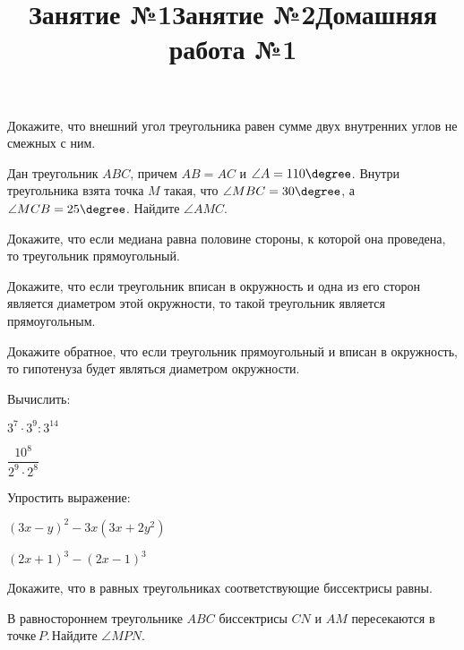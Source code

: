 \title{Занятие №1}
\begin{listofex}
	\item {}
	\item {}
	\item {}
	\item Докажите, что внешний угол треугольника равен сумме двух внутренних углов не смежных с ним.
	\item {}
	\item {}
	\item {}
	\item {}
	\item {}
	\item {}
\end{listofex}
\newpage
\title{Занятие №2}
\begin{listofex}
	\item Дан треугольник \( ABC \), причем \( AB = AC \) и \( \angle A = 110\degree \). Внутри треугольника взята точка \( M \) такая, что \( \angle MBC = 30\degree \), а \( \angle MCB = 25\degree \). Найдите \( \angle AMC \).
	\item Докажите, что если медиана равна половине стороны, к которой она проведена, то треугольник прямоугольный.
	\item {}
	\item Докажите, что если треугольник вписан в окружность и одна из его сторон является диаметром этой окружности, то такой треугольник является прямоугольным.
	\item Докажите обратное, что если треугольник прямоугольный и вписан в окружность, то гипотенуза будет являться диаметром окружности.
	\item {}
	\item {}
	\item {}
\end{listofex}
\newpage
\title{Домашняя работа №1}
\begin{listofex}
	\item Вычислить:
	\begin{enumcols}[itemcolumns=2]
		\item \( 3^7\cdot3^9:3^{14} \)
		\item \( \dfrac{10^8}{2^9\cdot2^8} \)
	\end{enumcols}
	\item Упростить выражение:
	\begin{enumcols}[itemcolumns=2]
		\item \( (3x-y)^2-3x(3x+2y^2) \)
		\item \( (2x+1)^3-(2x-1)^3 \)
	\end{enumcols}
	\item Докажите, что в равных треугольниках соответствующие биссектрисы равны.
	\item В равностороннем треугольнике \( ABC \) биссектрисы \( CN \) и \( AM \) пересекаются в точке \( P \). Найдите \( \angle MPN \).
	\item {}
	\item {}
	\item {}
\end{listofex}
